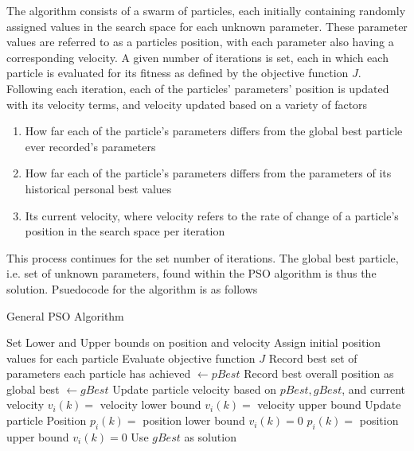 The algorithm consists of a swarm of particles, each initially containing randomly assigned values in the search space for each unknown
parameter. These parameter values are referred to as a particles position, with each parameter also having a corresponding velocity. A given number of iterations is set, each in which
each particle is evaluated for its fitness as defined by the objective function $J$. Following each iteration, each of the particles' parameters' position is updated with its velocity terms,
and velocity updated based on a variety of factors
\begin{enumerate}
    \item How far each of the particle's parameters differs from the global best particle ever recorded's parameters
    \item How far each of the particle's parameters differs from the parameters of its historical personal best values
    \item Its current velocity, where velocity refers to the rate of change of a particle's position in the search space per iteration
\end{enumerate}

\noindent This process continues for the set number of iterations. The global best particle, i.e. set of unknown parameters, found 
within the PSO algorithm is thus the solution. Psuedocode for the algorithm is as follows

\begin{algorithm}[H]
    \caption{General PSO Algorithm}
    \begin{algorithmic}
    
    \STATE Set Lower and Upper bounds on position and velocity
    \STATE Assign initial position values for each particle
    \ENDFOR
    \STATE Evaluate objective function $J$
    \ENDFOR
    \STATE Record best set of parameters each particle has achieved $\leftarrow pBest$
    \STATE Record best overall position as global best $\leftarrow gBest$
    \STATE Update particle velocity based on $pBest, gBest$, and current velocity
    \STATE $v_i(k) = $ velocity lower bound
    \STATE $v_i(k) = $ velocity upper bound
    \ENDIF
    \STATE Update particle Position
    \STATE $p_i(k) = $ position lower bound
    \STATE $v_i(k) = 0$
    \STATE $p_i(k) = $ position upper bound
    \STATE $v_i(k) = 0$
    \ENDIF
    \ENDFOR
    \ENDFOR
    \STATE Use $gBest$ as solution
    \end{algorithmic}
    \label{alg:PSOGeneral}

\end{algorithm}

